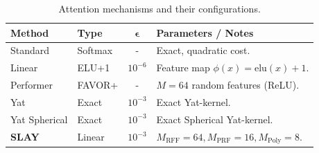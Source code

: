 \documentclass{article}
\begin{document}
\begin{table}[H]
\centering
\caption{Attention mechanisms and their configurations.}
\label{tab:attention_params}
\small
\begin{tabular}{llcl}
\toprule
\textbf{Method} & \textbf{Type} & $\bm{\epsilon}$ & \textbf{Parameters / Notes} \\
\midrule
Standard & Softmax & - & Exact, quadratic cost. \\
Linear & ELU+1 & $10^{-6}$ & Feature map $\phi(x) = \text{elu}(x)+1$. \\
Performer & FAVOR+ & - & $M=64$ random features (ReLU). \\
Yat & Exact & $10^{-3}$ & Exact Yat-kernel. \\
Yat Spherical & Exact & $10^{-3}$ & Exact Spherical Yat-kernel. \\
\textbf{SLAY} & Linear & $10^{-3}$ & $M_{\text{RFF}}=64, M_{\text{PRF}}=16, M_{\text{Poly}}=8$. \\
\bottomrule
\end{tabular}
\end{table}
\end{document}
